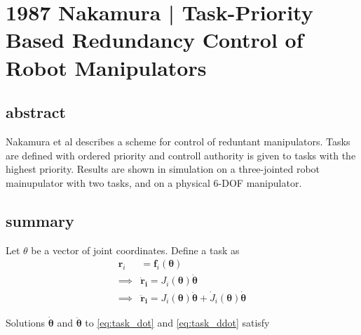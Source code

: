 \section{1987 Nakamura | Task-Priority Based Redundancy Control of Robot Manipulators}

\cite{nakamura1987} 

\subsection{abstract}
Nakamura et al describes a scheme for control of reduntant manipulators. Tasks are defined with ordered priority and controll authority is given to tasks with the highest priority. Results are shown in simulation on a three-jointed robot mainupulator with two tasks, and on a physical 6-DOF manipulator.

\subsection{summary}

Let $\theta$ be a vector of joint coordinates. Define a task as
\begin{align}
	\bm r_i &= \bm f_i(\bm \theta) \\
	\implies& \bm{\dot{r}_i} = J_i(\bm \theta) \bm{\dot \theta} \label{eq:task_dot}\\
	\implies& \bm{\ddot{r}_i} = J_i(\bm \theta) \bm{\ddot \theta} + \dot{J}_i(\bm \theta) \bm{\dot \theta} \label{eq:task_ddot}
\end{align}

Solutions $\bm{\dot\theta}$ and $\bm{\ddot\theta}$ to \autoref{eq:task_dot} and \autoref{eq:task_ddot} satisfy



